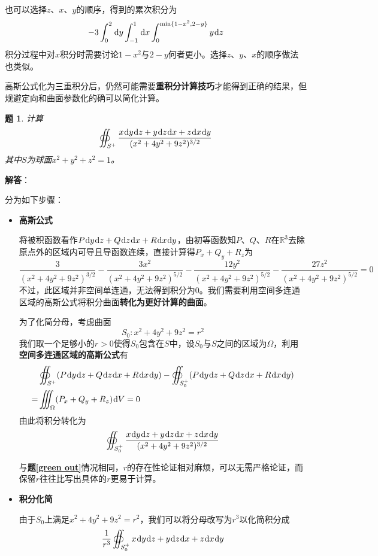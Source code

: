\documentclass[a4paper,UTF8,fontset=windows,AutoFakeBold]{ctexart}
\newcommand*{\dr}{\hspace{0.07em}\mathrm{d}}
\newcommand*{\rb}{\mathbb{R}}
\newcommand*{\note}{\noindent *}
\theoremstyle{ex}
\newtheorem{exercise}{题}
\newcommand{\exref}[1]{\textbf{题\;\ref{#1}\;}}
\newcommand{\sol}[1]{{\vspace{5pt}\kaishu\noindent\textbf{解答}：\vspace{-3pt}
\begin{compactitem}
    \item[] #1
\end{compactitem}
}}
\begin{document}
\begin{framed}
{\begin{itemize}
        \note 也可以选择$z$、$x$、$y$的顺序，得到的累次积分为
        $$-3\int_0^2\dr y\int_{-1}^1\dr x\int_0^{\min\{1-x^2,2-y\}}y\dr z$$
        积分过程中对$x$积分时需要讨论$1-x^2$与$2-y$何者更小。选择$z$、$y$、$x$的顺序做法也类似。
    \end{itemize}
}
\end{framed}

\note 高斯公式化为三重积分后，仍然可能需要\textbf{重积分计算技巧}才能得到正确的结果，但规避定向和曲面参数化的确可以简化计算。

\begin{framed}
\begin{exercise}
    计算
    $$\oiint_{S^+}\frac{x\dr y\dr z+y\dr z\dr x+z\dr x\dr y}{(x^2+4y^2+9z^2)^{3/2}}$$
    其中$S$为球面$x^2+y^2+z^2=1$。
\end{exercise}
\sol{
    分为如下步骤：
    \begin{itemize}
        \item \textbf{高斯公式}
        
        将被积函数看作$P\dr y\dr z+Q\dr z\dr x+R\dr x\dr y$，由初等函数知$P$、$Q$、$R$在$\rb^3$去除原点外的区域内可导且导函数连续，直接计算得$P_x+Q_y+R_z$为
        $$\frac{3}{(x^2+4y^2+9z^2)^{3/2}}-\frac{3x^2}{(x^2+4y^2+9z^2)^{5/2}}-\frac{12y^2}{(x^2+4y^2+9z^2)^{5/2}}-\frac{27z^2}{(x^2+4y^2+9z^2)^{5/2}}=0$$
        不过，此区域并非空间单连通，无法得到积分为0。我们需要利用空间多连通区域的高斯公式将积分曲面\textbf{转化为更好计算的曲面}。

        为了化简分母，考虑曲面
        $$S_0\colon x^2+4y^2+9z^2=r^2$$
        我们取一个足够小的$r>0$使得$S_0$包含在$S$中，设$S_0$与$S$之间的区域为$\Omega$，利用\textbf{空间多连通区域的高斯公式}有
        $$\begin{aligned}&\oiint_{S^+}(P\dr y\dr z+Q\dr z\dr x+R\dr x\dr y)-\oiint_{S_0^+}(P\dr y\dr z+Q\dr z\dr x+R\dr x\dr y)\\=&\iiint_\Omega(P_x+Q_y+R_z)\dr V=0\end{aligned}$$
        由此将积分转化为
        $$\oiint_{S_0^+}\frac{x\dr y\dr z+y\dr z\dr x+z\dr x\dr y}{(x^2+4y^2+9z^2)^{3/2}}$$

        \note 与\exref{green out}情况相同，$r$的存在性论证相对麻烦，可以无需严格论证，而保留$r$往往比写出具体的$r$更易于计算。

        \item \textbf{积分化简}
        
        由于$S_0$上满足$x^2+4y^2+9z^2=r^2$，我们可以将分母改写为$r^3$以化简积分成
        $$\frac{1}{r^3}\oiint_{S_0^+}x\dr y\dr z+y\dr z\dr x+z\dr x\dr y$$
        

\end{itemize}}
\end{framed}
\end{document}
